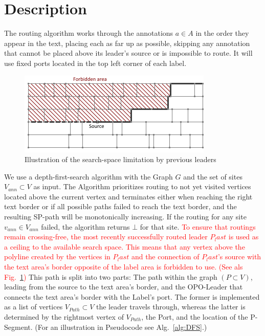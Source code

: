 \documentclass[11pt,a4paper]{vutinfth}
\newcommand{\change}[1]{\textcolor{red}{#1}}
\begin{document}
\section{Description}
\label{sec:AlgDesc}

The routing algorithm works through the annotations $a \in A$ in the order they appear in the text, placing each as far up as possible, skipping any annotation that cannot be placed above its leader's source or is impossible to route. It will use fixed ports located in the top left corner of each label.

\begin{figure}
	\captionsetup{justification=centering, margin=0.75cm}
	\centering
	\includegraphics[scale=1]{Ceiling.png}
	\caption{Illustration of the search-space limitation by previous leaders}
	\label{fig:ceil}
\end{figure}

We use a depth-first-search algorithm with the Graph $G$ and the set of sites $V_{ann} \subset V$ as input. The Algorithm prioritizes routing to not yet visited vertices located above the current vertex and terminates either when reaching the right text border or if all possible paths failed to reach the text border, and the resulting SP-path will be monotonically increasing. If the routing for any site $v_{ann} \in V_{ann}$ failed, the algorithm returns $\bot$ for that site. \change{To ensure that routings remain crossing-free, the most recently successfully routed leader $P_last$ is used as a ceiling to the available search space. This means that any vertex above the polyline created by the vertices in $P_last$ and the connection of $P_last$'s source with the text area's border opposite of the label area is forbidden to use. (See als Fig.~\ref{fig:ceil})} This path is split into two parts: The path within the graph $(P \subset V)$, leading from the source to the text area's border, and the OPO-Leader that connects the text area's border with the Label's port. The former is implemented as a list of vertices $V_{Path} \subset V$ the leader travels through, whereas the latter is determined by the rightmost vertex of $V_{Path}$, the Port, and the location of the P-Segment. (For an illustration in Pseudocode see Alg.~\ref{alg:DFS}.)
\end{document}
